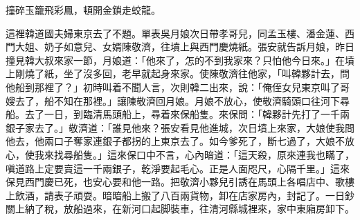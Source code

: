 \begin{myquote}
撞碎玉籠飛彩鳳，頓開金鎖走蛟龍。
\end{myquote}

這裡韓道國夫婦東京去了不題。單表吳月娘次日帶孝哥兒，同孟玉樓、潘金蓮、西門大姐、奶子如意兒、女婿陳敬濟，往墳上與西門慶燒紙。張安就告訴月娘，昨日撞見韓大叔來家一節，月娘道：「他來了，怎的不到我家來？只怕他今日來。」在墳上剛燒了紙，坐了沒多回，老早就起身來家。使陳敬濟往他家，「叫韓夥計去，問他船到那裡了？」初時叫着不聞人言，次則韓二出來，說：「俺侄女兒東京叫了哥嫂去了，船不知在那裡。」讓陳敬濟回月娘。月娘不放心，使敬濟騎頭口往河下尋船。去了一日，到臨清馬頭船上，尋着來保船隻。來保問：「韓夥計先打了一千兩銀子家去了。」敬濟道：「誰見他來？張安看見他進城，次日墳上來家，大娘使我問他去，他兩口子奪家連銀子都拐的上東京去了。如今爹死了，斷七過了，大娘不放心，使我來找尋船隻。」這來保口中不言，心內暗道：「這天殺，原來連我也瞞了，嗔道路上定要賣這一千兩銀子，乾淨要起毛心。正是人面咫尺，心隔千里。」這來保見西門慶已死，也安心要和他一路。把敬濟小夥兒引誘在馬頭上各唱店中、歌樓上飲酒，請表子頑耍。暗暗船上搬了八百兩貨物，卸在店家房內，封記了。一日鈔關上納了稅，放船過來，在新河口起脚裝車，往清河縣城裡來，家中東廂房卸下。

